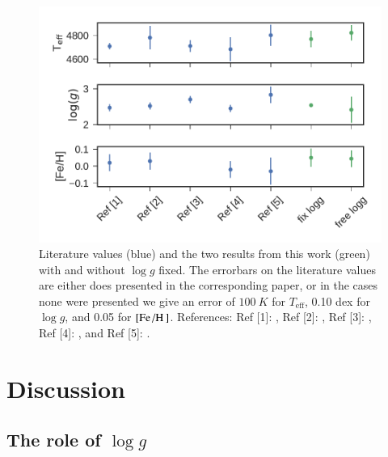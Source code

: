 \documentclass{aa}
\begin{document}
\begin{figure}[htpb!!]
    \centering
    \includegraphics[width=1.0\linewidth]{figures/10LeoParams.pdf}
    \caption{Literature values (blue) and the two results from this work (green)
             with and without $\log g$ fixed. The errorbars on the literature
             values are either does presented in the corresponding paper, or in
             the cases none were presented we give an error of $\SI{100}{K}$ for
             $T_\mathrm{eff}$, 0.10 dex for $\log g$, and 0.05 for
             $[\ion{Fe}/\ion{H}]$.
             References:
             Ref [1]: \citet{Luck2015},
             Ref [2]: \citet{Park2013},
             Ref [3]: \citet{Massarotti2008},
             Ref [4]: \citet{Soubiran2008}, and
             Ref [5]: \cite{daSilva2011}.}
    \label{fig:10leo}
\end{figure}



\section{Discussion}
\label{sec:discussion}

\subsection{The role of $\log g$}
\end{document}
